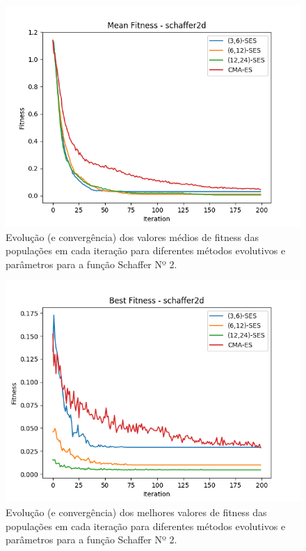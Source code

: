 \documentclass[conference]{IEEEtran}
\begin{document}
\begin{figure}[htbp]
\centering
\centerline{\includegraphics[scale=0.5]{imagens/schaffer2d/mean_fitness.png}}
\caption{Evolução (e convergência) dos valores médios de fitness das populações em cada iteração para diferentes métodos evolutivos e parâmetros para a função Schaffer Nº 2.}
\label{schaffer2d/mean_fitness}
\end{figure}

\begin{figure}[htbp]
\centering
\centerline{\includegraphics[scale=0.5]{imagens/schaffer2d/best_fitness.png}}
\caption{Evolução (e convergência) dos melhores valores de fitness das populações em cada iteração para diferentes métodos evolutivos e parâmetros para a função Schaffer Nº 2.}
\label{schaffer2d/best_fitness}
\end{figure}
\end{document}

